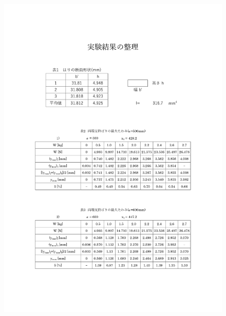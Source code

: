 \documentclass[a4paper,11pt]{jsarticle}
\begin{document}
\clearpage

\begin{figure}[htbp]
  \centering
  \includegraphics[page=2,width=\textwidth,height=\textheight]{1.pdf}
\end{figure}
\clearpage
\end{document}
